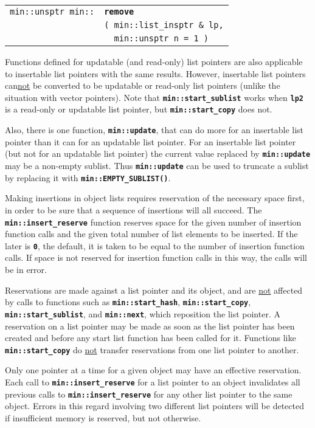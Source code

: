 \documentclass[12pt]{article}
\makeatletter
\newcommand{\TT}[1]{{\tt \bfseries #1}}
\newcommand{\ttindex}[1]{\index{#1@{\tt #1}}}
\newcommand{\EOL}{\penalty \exhyphenpenalty}
\newenvironment{indpar}[1][0.3in]%
	{\begin{list}{}%
		     {\setlength{\itemsep}{0in}%
		      \setlength{\topsep}{0in}%
		      \setlength{\parsep}{1ex}%
		      \setlength{\labelwidth}{#1}%
		      \setlength{\leftmargin}{#1}%
		      \addtolength{\leftmargin}{\labelsep}}%
	 \item}%
	{\end{list}}
\newcommand{\LABEL}[1]{\label{#1}}
\newlength{\ARGBREAKLENGTH}
\newcommand{\ARGBREAK}[1][\ARGBREAKLENGTH]{\\&\hspace*{#1}}
\newcommand{\MINKEY}[1]%
	   {\TT{#1}\ttindex{min::#1}\ttindex{#1}}
\makeatother
\begin{document}
\begin{indpar}\begin{tabular}{r@{}l}
\verb|min::unsptr min::|
	& \MINKEY{remove}\ARGBREAK
	  \verb|( min::list_insptr & lp,|\ARGBREAK
	  \verb|  min::unsptr n = 1 )|
\LABEL{MIN::REMOVE_FROM_LIST_INSPTR} \\
\end{tabular}\end{indpar}

Functions defined for updatable (and read-only) list pointers are also
applicable to insertable list pointers with the
same results.  However, insertable list pointers
can\underline{not} be converted to be updatable or read-only list pointers
(unlike the situation with vector pointers).
Note that \TT{min::start\_\EOL sublist} works when
\TT{lp2} is a read-only or updatable
list pointer, but \TT{min::start\_\EOL copy}
does not.

Also, there is one function, \TT{min::update}, that can do more for
an insertable list pointer than it can for an updatable list pointer.  For
an insertable list pointer (but not for an updatable list pointer)
the current value replaced by \TT{min::update}
may be a non-empty sublist.  Thus \TT{min::update} can be used
to truncate a sublist by replacing it with \TT{min::\EOL EMPTY\_\EOL SUBLIST()}.

Making insertions in object lists requires reservation of the necessary
space first, in order to be sure that a sequence of insertions will
all succeed.
The \TT{min::insert\_reserve} function reserves space for the given number
of insertion function calls and the given total number of list elements
to be inserted.  If the later is \TT{0}, the default, it is taken to
be equal to the number of insertion function calls.  If space is not
reserved for insertion function calls in this way, the calls will be
in error.

Reservations are made against a list pointer and its object, and are
\underline{not} affected by calls to functions such as
\TT{min::\EOL start\_\EOL hash}, \TT{min::\EOL start\_\EOL copy},
\TT{min::\EOL start\_\EOL sublist}, and \TT{min::\EOL next},
which reposition the list pointer.
A reservation on a list pointer may be made as soon as the list pointer
has been created and before any start list function has been called
for it.  Functions like \TT{min::\EOL start\_\EOL copy} do
\underline{not} transfer reservations from one list pointer to another.

Only one pointer at a time
for a given object may have an effective reservation.
Each call to \TT{min::\EOL insert\_reserve} for a list pointer
to an object invalidates all previous calls to
\TT{min::\EOL insert\_reserve} for any other list pointer
to the same object.  Errors in this regard involving two different
list pointers will be detected if insufficient memory is reserved,
but not otherwise.
\end{document}
